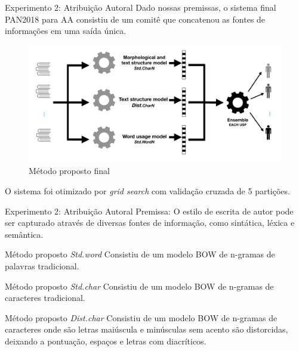 \begin{frame}{Experimento 2: Atribuição Autoral}
Dado nossas premissas, o sistema final PAN2018 para AA consistiu de um comitê que concatenou as fontes de informações em uma saída única.

\begin{figure}[]\selectFont
\caption{\selectFont Método proposto final}
\includegraphics[width=.7\textwidth]{images/prop1_Diagramas.png}
\end{figure}

O sistema foi otimizado por {\it grid search} com validação cruzada de 5 partições.
\end{frame}

\begin{frame}{Experimento 2: Atribuição Autoral}
Premissa: O estilo de escrita de autor pode ser capturado através de diversas fontes de informação, como sintática, léxica e semântica.
\begin{block}{Método proposto {\it Std.word}}
Consistiu de um modelo BOW de n-gramas de palavras tradicional.
\end{block}
\begin{block}{Método proposto {\it Std.char}}
Consistiu de um modelo BOW de n-gramas de caracteres tradicional.
\end{block}
\begin{block}{Método proposto {\it Dist.char}}
Consistiu de um modelo BOW de n-gramas de caracteres onde são letras maiúscula e minúsculas sem acento são distorcidas, deixando a pontuação, espaços e letras com diacríticos.
\end{block}
\end{frame}

